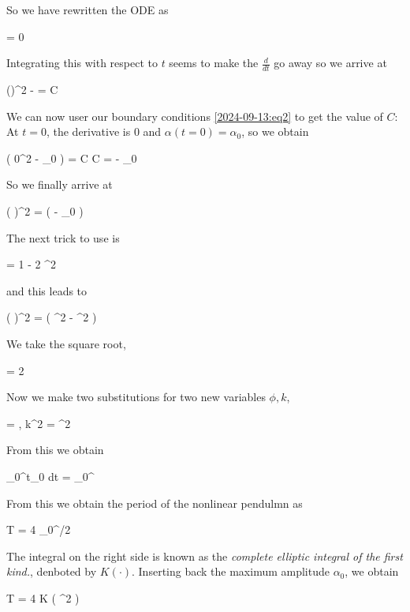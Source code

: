 So we have rewritten the ODE as

\bee
{}  = 0
\eee

Integrating this with respect to $t$ seems to make the $\frac{d}{dt}$ go away so we arrive at

\bee
\left(\right)^2 -  \cos \alpha = C
\eee

We can now user our boundary conditions \eqref{2024-09-13:eq2} to get the value of $C$: At $t=0$, the derivative is $0$ and $\alpha(t=0) = \alpha_0$, so we obtain

\bee
\left( 0^2 -  \cos \alpha_0 \right) = C \rightarrow C = - \cos \alpha_0
\eee

So we finally arrive at 

\bee
\left( \right)^2 =  \left( \cos \alpha - \cos \alpha_0 \right)
\eee

The next trick to use is

\bee
\cos \alpha = 1 - 2 \sin^2 
\eee

and this leads to

\bee
\left( \right)^2 =  \left( \sin^2  - \sin^2  \right)
\eee

We take the square root,

\bee
{} = 2   
\eee

Now we make two substitutions for two new variables $\phi, k$,

\bee
\sin {} = \sin {} \sin \phi, \quad k^2 = \sin^2 
\eee

From this we obtain

\bee
\int_0^{t_0} dt =  \int_0^\phi {}
\eee

From this we obtain the period of the nonlinear pendulmn as

\bee
T = 4   \int_0^{\pi/2} 
\eee

The integral on the right side is known as the \emph{complete elliptic integral of the first kind.}, denboted by $K( \cdot )$. Inserting back the maximum amplitude $\alpha_0$, we obtain

\bee
T = 4  K \left( \sin^2  \right)
\eee

